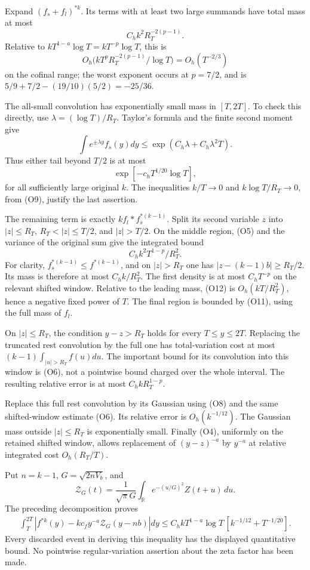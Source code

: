 \documentclass[11pt,a4paper]{article}
\begin{document}
Expand \((f_s+f_l)^{*k}\). Its terms with at least two large summands
have total mass at most \[
C_h k^2R_T^{-2(p-1)}.\tag{O10}
\] Relative to \(kT^{1-a}\log T=kT^{-p}\log T\), this is \[
O_h\bigl(kT^pR_T^{-2(p-1)}/\log T\bigr)=O_h(T^{-2/3})
\] on the cofinal range; the worst exponent occurs at \(p=7/2\), and is
\(5/9+7/2-(19/10)(5/2)=-25/36\).

The all-small convolution has exponentially small mass in \([T,2T]\). To
check this directly, use \(\lambda=(\log T)/R_T\). Taylor's formula and
the finite second moment give \[
\int e^{\pm\lambda y}f_s(y)dy
\le\exp(C_h\lambda+C_h\lambda^2T).
\] Thus either tail beyond \(T/2\) is at most \[
\exp[-c_hT^{1/20}\log T],\tag{O11}
\] for all sufficiently large original \(k\). The inequalities
\(k/T\to0\) and \(k\log T/R_T\to0\), from (O9), justify the last
assertion.

The remaining term is exactly \(k f_l*f_s^{*(k-1)}\). Split its second
variable \(z\) into \(|z|\le R_T\), \(R_T<|z|\le T/2\), and \(|z|>T/2\).
On the middle region, (O5) and the variance of the original sum give the
integrated bound \[
C_h k^2T^{1-p}/R_T^2.\tag{O12}
\] For clarity, \(f_s^{*(k-1)}\le f^{*(k-1)}\), and on \(|z|>R_T\) one
has \(|z-(k-1)b|\ge R_T/2\). Its mass is therefore at most
\(C_h k/R_T^2\). The first density is at most \(C_hT^{-p}\) on the
relevant shifted window. Relative to the leading mass, (O12) is
\(O_h(kT/R_T^2)\), hence a negative fixed power of \(T\). The final
region is bounded by (O11), using the full mass of \(f_l\).

On \(|z|\le R_T\), the condition \(y-z>R_T\) holds for every
\(T\le y\le2T\). Replacing the truncated rest convolution by the full
one has total-variation cost at most \((k-1)\int_{|u|>R_T}f(u)du\). The
important bound for its convolution into this window is (O6), not a
pointwise bound charged over the whole interval. The resulting relative
error is at most \(C_h kR_T^{1-p}\).

Replace this full rest convolution by its Gaussian using (O8) and the
same shifted-window estimate (O6). Its relative error is
\(O_h(k^{-1/12})\). The Gaussian mass outside \(|z|\le R_T\) is
exponentially small. Finally (O4), uniformly on the retained shifted
window, allows replacement of \((y-z)^{-a}\) by \(y^{-a}\) at relative
integrated cost \(O_h(R_T/T)\).

Put \(n=k-1\), \(G=\sqrt{2nV_b}\), and \[
\mathcal Z_G(t)=\frac1{\sqrt\pi G}
\int_{\mathbb R}e^{-(u/G)^2}Z(t+u)\,du.
\] The preceding decomposition proves \[
\boxed{\begin{aligned}
\int_T^{2T}\left|f^{*k}(y)-kc_fy^{-a}
\mathcal Z_G(y-nb)\right|dy
\le C_h kT^{1-a}\log T\,[k^{-1/12}+T^{-1/20}].
\end{aligned}}\tag{O13}
\] Every discarded event in deriving this inequality has the displayed
quantitative bound. No pointwise regular-variation assertion about the
zeta factor has been made.
\end{document}
